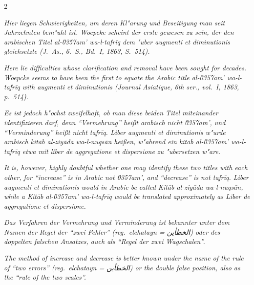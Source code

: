 \documentclass[10pt,a4paper]{article}
\newcommand{\RL}[1]{\beginR#1\endR}
\newcommand{\ar}[1]{{\arabicfont\RL{#1}}}
\newcommand{\enquote}[1]{``#1''}
\begin{document}
\begin{paracol}{2}
\switchcolumn*

\textit{Hier liegen Schwierigkeiten, um deren Kl"arung und Beseitigung man seit Jahrzehnten bem"uht ist. Woepcke scheint der erste gewesen zu sein, der den arabischen Titel \textit{al-\u0357{}am' wa-l-tafr\={i}q} dem "uber \textit{augmenti et diminutionis} gleichsetzte (J.\ As., 6.\ S., Bd.\ I, 1863, S.\ 514).}

\switchcolumn

\textit{Here lie difficulties whose clarification and removal have been sought for decades. Woepcke seems to have been the first to equate the Arabic title \textit{al-\u0357{}am' wa-l-tafr\={i}q} with \textit{augmenti et diminutionis} (\textit{Journal Asiatique}, 6th ser., vol.\ I, 1863, p.\ 514).}

\switchcolumn*

\textit{Es ist jedoch h"ochst zweifelhaft, ob man diese beiden Titel miteinander identifizieren darf, denn \enquote{Vermehrung} hei\ss{}t arabisch nicht \textit{\u0357{}am'}, und \enquote{Verminderung} hei\ss{}t nicht \textit{tafr\={i}q}. \textit{Liber augmenti et diminutionis} w"urde arabisch \textit{kit\=ab al-ziy\=ada wa-l-nuqs\=an} hei\ss{}en, w"ahrend ein \textit{kit\=ab al-\u0357{}am' wa-l-tafr\={i}q} etwa mit \textit{liber de aggregatione et dispersione} zu "ubersetzen w"are.}

\switchcolumn

\textit{It is, however, highly doubtful whether one may identify these two titles with each other, for \enquote{increase} is in Arabic not \textit{\u0357{}am'}, and \enquote{decrease} is not \textit{tafr\={i}q}. \textit{Liber augmenti et diminutionis} would in Arabic be called \textit{Kit\=ab al-ziy\=ada wa-l-nuqs\=an}, while a \textit{Kit\=ab al-\u0357{}am' wa-l-tafr\={i}q} would be translated approximately as \textit{Liber de aggregatione et dispersione}.}

\switchcolumn*

\textit{Das Verfahren der Vermehrung und Verminderung ist bekannter unter dem Namen der Regel der \enquote{zwei Fehler} (\textit{reg.\ elchatayn} = \ar{الخطأين}) oder des doppelten falschen Ansatzes, auch als \enquote{Regel der zwei Wagschalen}.}

\switchcolumn

\textit{The method of increase and decrease is better known under the name of the rule of \enquote{two errors} (\textit{reg.\ elchatayn} = \ar{الخطأين}) or the double false position, also as the \enquote{rule of the two scales}.}


\end{paracol}
\end{document}
